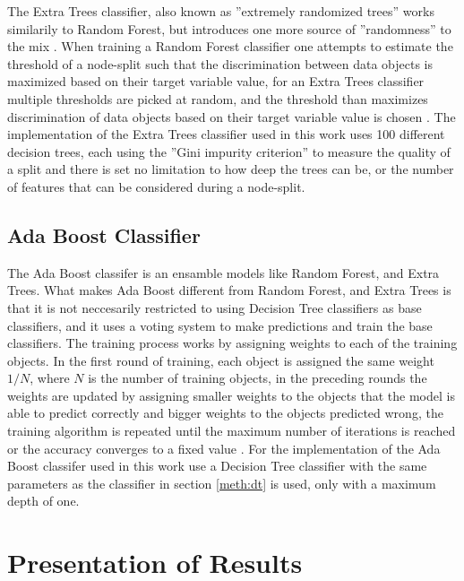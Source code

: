 The Extra Trees classifier, also known as ''extremely randomized trees'' works similarily to Random Forest, but introduces one more source of ''randomness'' to the mix \cite{scikit_learn}. When training a Random Forest classifier one attempts to estimate the threshold of a node-split such that the discrimination between data objects is maximized based on their target variable value, for an Extra Trees classifier multiple thresholds are picked at random, and the threshold than maximizes discrimination of data objects based on their target variable value is chosen \cite{scikit_learn}. The implementation of the Extra Trees classifier used in this work uses 100 different decision trees, each using the ''Gini impurity criterion'' to measure the quality of a split and there is set no limitation to how deep the trees can be, or the number of features that can be considered during a node-split.

\subsection{Ada Boost Classifier}
The Ada Boost classifer is an ensamble models like Random Forest, and Extra Trees. What makes Ada Boost different from Random Forest, and Extra Trees is that it is not neccesarily restricted to using Decision Tree classifiers as base classifiers, and it uses a voting system to make predictions and train the base classifiers. The training process works by assigning weights to each of the training objects. In the first round of training, each object is assigned the same weight $1/N$, where $N$ is the number of training objects, in the preceding rounds the weights are updated by assigning smaller weights to the objects that the model is able to predict correctly and bigger weights to the objects predicted wrong, the training algorithm is repeated until the maximum number of iterations is reached or the accuracy converges to a fixed value \cite{scikit_learn}. For the implementation of the Ada Boost classifer used in this work use a Decision Tree classifier with the same parameters as the classifier in section \ref{meth:dt} is used, only with a maximum depth of one.

\section{Presentation of Results}

